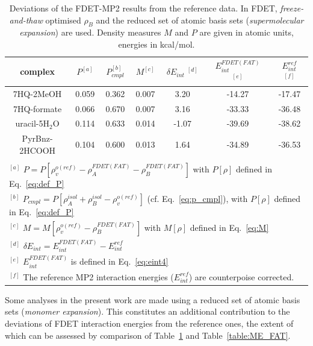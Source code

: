 \documentclass[amsmath,amssymb,preprint,aip,jcp]{revtex4-1}
\begin{document}
\begin{table}
{
\begin{center}
\begin{tabular}{|c|c|c|c|c|c|c|}
\hline
 complex & $P^{[a]}$ & $P_{cmpl}^{[b]}$ & $M^{[c]}$ & $\delta E_{int}\;^{[d]}$ & $E^{FDET(FAT)}_{int}$ $^{[e]}$ & $E_{int}^{ref}$ $^{[f]}$ \\ \hline
7HQ-2MeOH & 0.059 & 0.362 & 0.007 & 3.20 & -14.27 & -17.47 \\ \hline
7HQ-formate & 0.066 & 0.670 & 0.007 & 3.16 & -33.33 & -36.48 \\ \hline
uracil-5H$_2$O & 0.114 & 0.633 & 0.014 & -1.07 & -39.69 & -38.62 \\ \hline
PyrBnz-2HCOOH & 0.104 & 0.600 & 0.013 & 1.64 & -34.89 & -36.53 \\ \hline
\multicolumn{7}{c}{ } \\
\multicolumn{7}{l}{$^{[a]}$ $P=P[\rho_v^{o(ref)} - \rho_{A}^{FDET(FAT)}-\rho_B^{FDET(FAT)}]$ with $P[\rho]$ defined in Eq.~\ref{eq:def_P}}\\
\multicolumn{7}{l}{$^{[b]}$ $P_{cmpl}=P[\rho_A^{isol}+\rho_B^{isol} - \rho_v^{o(ref)}]$ (cf. Eq.~\ref{eq:p_cmpl}), with $P[\rho]$ defined in Eq.~\ref{eq:def_P}}\\
\multicolumn{7}{l}{$^{[c]}$ $M=M[\rho_v^{o(ref)} - \rho^{FDET(FAT)}_{B}]$ with $M[\rho]$ defined in Eq.~\ref{eq:M}}\\
\multicolumn{7}{l}{$^{[d]}$ $\delta E_{int}=E^{FDET(FAT)}_{int}-E_{int}^{ref}$} \\
\multicolumn{7}{l}{$^{[e]}$ $E^{FDET(FAT)}_{int}$ is defined in Eq.~\ref{eq:eint4}}\\
\multicolumn{7}{l}{$^{[f]}$ The reference MP2 interaction energies ($E_{int}^{ref}$) are counterpoise corrected.}
\end{tabular}
\end{center}
}%
\caption{Deviations of the FDET-MP2 results from the reference data. In FDET, \textit{freeze-and-thaw} optimised $\rho_B$ and the reduced set of atomic basis sets ({\it supermolecular expansion}) are used. 
Density measures $M$ and $P$ are given in atomic units, energies in kcal/mol.
}
\label{table:SE_FAT}
\end{table}

Some analyses in the present work are made using a reduced set of atomic basis sets ({\it monomer expansion}). This constitutes an additional contribution to the deviations of FDET interaction energies from the reference ones, the extent of which can be assessed by comparison of Table~\ref{table:SE_FAT} and Table~\ref{table:ME_FAT}.
\end{document}
